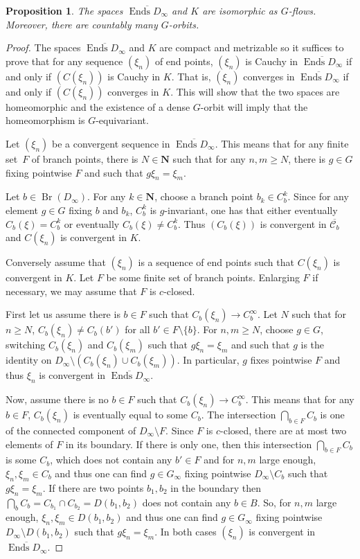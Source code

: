 \documentclass[JEP,XML,SOM,Unicode,NoFloatCountersInSection]{cedram}
\let\mathcal\mathscr
\theoremstyle{plain}
\newtheorem{prop}[thm]{Proposition}
\theoremstyle{definition}
\newcommand{\NN}{\mathbf{N}}
\newcommand{\cC}{\mathcal{C}}
\DeclareMathOperator{\Ends}{Ends}
\DeclareMathOperator{\Br}{Br}
\begin{document}
\begin{prop} The spaces $\overline{\Ends{D_\infty}}$ and $K$ are isomorphic as $G$-flows. Moreover, there are countably many $G$-orbits.
\end{prop}

\begin{proof} The spaces $\overline{\Ends{D_\infty}}$ and $K$ are compact and metrizable so it suffices to prove that for any sequence $(\xi_n)$ of end points, $(\xi_n)$ is Cauchy in $\overline{\Ends{D_\infty}}$ if and only if $(C(\xi_n))$ is Cauchy in $K$. That is, $(\xi_n)$ converges in $\overline{\Ends{D_\infty}}$ if and only if $(C(\xi_n))$ converges in $K$. This will show that the two spaces are homeomorphic and the existence of a dense $G$-orbit will imply that the homeomorphism is $G$-equivariant.

Let $(\xi_n)$ be a convergent sequence in $\overline{\Ends{D_\infty}}$. This means that for any finite set~$F$ of branch points, there is $N\in \NN$ such that for any $n,m\geq N$, there is $g\in G$ fixing pointwise $F$ and such that $g\xi_n=\xi_m$.

Let $b\in \Br(D_\infty)$. For any $k\in\NN$, choose a branch point $b_k\in C_b^{k}$. Since for any element $g\in G$ fixing $b$ and $b_k$, $C^k_b$ is $g$-invariant, one has that either eventually $C_b(\xi)=C_b^k$ or eventually $C_b(\xi)\neq C^k_b$. Thus $(C_b(\xi))$ is convergent in $\overline{\cC_b}$ and $C(\xi_n)$ is convergent in $K$.

Conversely assume that $(\xi_n)$ is a sequence of end points such that $C(\xi_n)$ is convergent in $K$. Let $F$ be some finite set of branch points. Enlarging $F$ if necessary, we may assume that $F$ is $c$-closed.

First let us assume there is $b\in F$ such that $C_b(\xi_n)\to C_b^\infty$. Let $N$ such that for $n\geq N$, $C_b(\xi_n)\neq C_b(b')$ for all $b'\in F\setminus\{b\}$. For $n,m\geq N$, choose $g\in G$, switching $C_b(\xi_n)$ and $C_b(\xi_m)$ such that $g\xi_n=\xi_m$ and such that $g$ is the identity on $D_\infty\setminus (C_b(\xi_n)\cup C_b(\xi_m))$. In particular, $g$ fixes pointwise $F$ and thus $\xi_n$ is convergent in $\overline{\Ends{D_\infty}}$.

Now, assume there is no $b\in F$ such that $C_b(\xi_n)\to C_b^\infty$. This means that for any $b\in F$, $C_b(\xi_n)$ is eventually equal to some $C_b$. The intersection $\bigcap_{b\in F} C_b$ is one of the connected component of $D_\infty\setminus F$. Since $F$ is $c$-closed, there are at most two elements of $F$ in its boundary. If there is only one, then this intersection $\bigcap_{b\in F} C_b$ is some $C_b$, which does not contain any $b'\in F$ and for $n,m$ large enough, $\xi_n,\xi_m\in C_b$ and thus one can find $g\in G_\infty$ fixing pointwise $D_\infty\setminus C_b$ such that $g\xi_n=\xi_m$. If there are two points $b_1,b_2$ in the boundary then $\bigcap_b C_b=C_{b_1}\cap C_{b_2}=D(b_1,b_2)$ does not contain any $b\in B$. So, for $n,m$ large enough, $\xi_n,\xi_m\in D(b_1,b_2)$ and thus one can find $g\in G_\infty$ fixing pointwise $D_\infty\setminus D(b_1,b_2)$ such that $g\xi_n=\xi_m$. In both cases $(\xi_n)$ is convergent in $\overline{\Ends{D_\infty}}$.


\end{proof}
\end{document}
